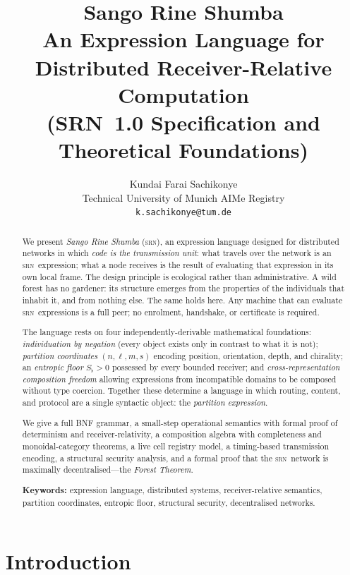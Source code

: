 \documentclass[twocolumn,11pt,a4paper]{article}
\title{\textbf{Sango Rine Shumba}\\[4pt]
\large An Expression Language for Distributed Receiver-Relative Computation\\[2pt]
\normalsize (SRN~1.0 Specification and Theoretical Foundations)}
\author{Kundai Farai Sachikonye\\
\small Technical University of Munich \quad AIMe Registry\\
\small \texttt{k.sachikonye@tum.de}}
\date{}
\theoremstyle{definition}
\theoremstyle{remark}
\newcommand{\srn}{\textsc{srn}}
\newcommand{\floor}{S_{\flat}}
\begin{document}
\maketitle

\begin{abstract}
We present \emph{Sango Rine Shumba} (\srn), an expression language
designed for distributed networks in which \emph{code is the
transmission unit}: what travels over the network is an \srn\
expression; what a node receives is the result of evaluating that
expression in its own local frame.  The design principle is ecological
rather than administrative.  A wild forest has no gardener: its
structure emerges from the properties of the individuals that inhabit
it, and from nothing else.  The same holds here.  Any machine that
can evaluate \srn\ expressions is a full peer; no enrolment,
handshake, or certificate is required.

The language rests on four independently-derivable mathematical
foundations: \emph{individuation by negation} (every object exists only
in contrast to what it is not); \emph{partition coordinates}
$(n,\ell,m,s)$ encoding position, orientation, depth, and chirality;
an \emph{entropic floor} $\floor > 0$ possessed by every bounded
receiver; and \emph{cross-representation composition freedom} allowing
expressions from incompatible domains to be composed without type
coercion.  Together these determine a language in which routing,
content, and protocol are a single syntactic object: the
\emph{partition expression}.

We give a full BNF grammar, a small-step operational semantics with
formal proof of determinism and receiver-relativity, a composition
algebra with completeness and monoidal-category theorems, a live cell
registry model, a timing-based transmission encoding, a structural
security analysis, and a formal proof that the \srn\ network is
maximally decentralised---the \emph{Forest Theorem}.

\textbf{Keywords:} expression language, distributed systems, receiver-relative
semantics, partition coordinates, entropic floor, structural security,
decentralised networks.
\end{abstract}

\section{Introduction}
\label{sec:intro}
\end{document}
